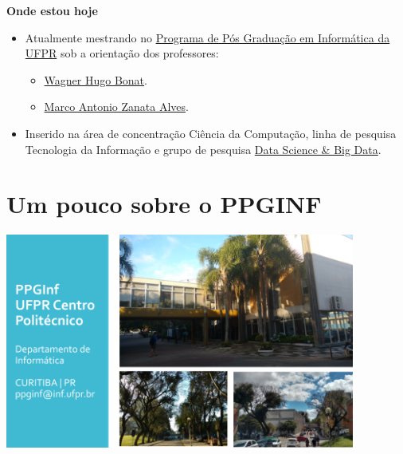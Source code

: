 \documentclass[10pt,
  aspectratio=169,
  serif,
  mathserif,
  professionalfont,
  compress,
  handout,
  ]{beamer}\usepackage[]{graphicx}\usepackage[]{color}
\begin{document}
\begin{frame}[c, allowframebreaks]

  \textbf{Onde estou hoje}

  \begin{itemize}

  \item Atualmente mestrando no \href{http://www.prppg.ufpr.br/ppginformatica/?lang=pb}{Programa de Pós Graduação em Informática da UFPR} sob a orientação dos professores:
  
  \begin{itemize}
    \item \href{http://www.leg.ufpr.br/~wagner/}{Wagner Hugo Bonat}.
    \item \href{https://web.inf.ufpr.br/mazalves/}{Marco Antonio Zanata Alves}. 
  \end{itemize}

  \item Inserido na área de concentração Ciência da Computação, linha de pesquisa Tecnologia da Informação e grupo de pesquisa \href{https://web.inf.ufpr.br/dsbd/}{Data Science \& Big Data}.
  
  \end{itemize}

\end{frame}


\section{Um pouco sobre o PPGINF}

\begin{frame}[c, allowframebreaks]
  
  \begin{center}  
    \includegraphics[width=11.5cm]{img/ppginf.png}  
  \end{center}

\end{frame}
\end{document}
